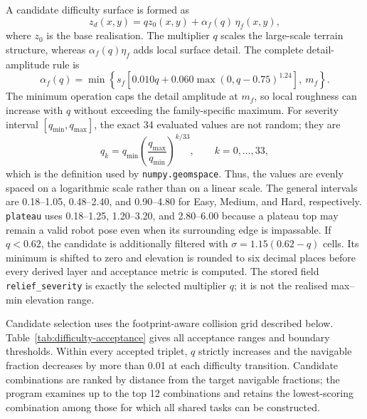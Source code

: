 \documentclass[11pt]{article}
\begin{document}
A candidate difficulty surface is formed as
\begin{equation}
  z_d(x,y)=q z_0(x,y)+\alpha_f(q)\,\eta_f(x,y),
\end{equation}
where $z_0$ is the base realisation. The multiplier $q$ scales the large-scale
terrain structure, whereas $\alpha_f(q)\eta_f$ adds local surface detail. The
complete detail-amplitude rule is
\begin{equation}
  \alpha_f(q)=\min\!\left\{s_f\left[0.010q+
  0.060\max(0,q-0.75)^{1.24}\right],\ m_f\right\}.
\end{equation}
The minimum operation caps the detail amplitude at $m_f$, so local roughness
can increase with $q$ without exceeding the family-specific maximum.
For severity interval $[q_{\min},q_{\max}]$, the exact 34 evaluated values are
not random; they are
\begin{equation}
  q_k=q_{\min}\left(\frac{q_{\max}}{q_{\min}}\right)^{k/33},
  \qquad k=0,\ldots,33,
\end{equation}
which is the definition used by \texttt{numpy.geomspace}. Thus, the values are
evenly spaced on a logarithmic scale rather than on a linear scale. The general intervals are
0.18--1.05, 0.48--2.40, and 0.90--4.80 for Easy, Medium, and Hard,
respectively. \texttt{plateau} uses 0.18--1.25, 1.20--3.20, and 2.80--6.00
because a plateau top may remain a valid robot pose even when its surrounding
edge is impassable. If $q<0.62$, the candidate is additionally filtered with
$\sigma=1.15(0.62-q)$ cells. Its minimum is shifted to zero and elevation is
rounded to six decimal places before every derived layer and acceptance metric
is computed. The stored field \texttt{relief\_severity} is exactly the selected
multiplier $q$; it is not the realised max--min elevation range.

Candidate selection uses the footprint-aware collision grid described below.
Table~\ref{tab:difficulty-acceptance} gives all acceptance ranges and boundary
thresholds. Within every accepted triplet, $q$ strictly increases and the
navigable fraction decreases by more than 0.01 at each difficulty transition.
Candidate combinations are ranked by distance from the target navigable
fractions; the program examines up to the top 12 combinations and retains the
lowest-scoring combination among those for which all shared tasks can be
constructed.
\end{document}
